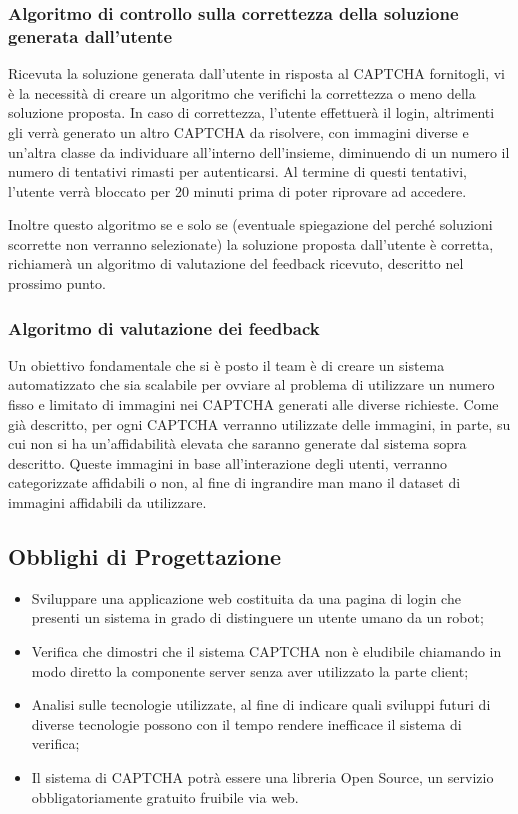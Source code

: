\subsubsection{Algoritmo di controllo sulla correttezza della soluzione generata dall'utente}
Ricevuta la soluzione generata dall'utente in risposta al CAPTCHA fornitogli, vi è la necessità di creare un algoritmo che verifichi la correttezza o meno della soluzione proposta. In caso di correttezza, l'utente effettuerà il login, altrimenti gli verrà generato un altro CAPTCHA da risolvere, con immagini diverse e un'altra classe da individuare all'interno dell'insieme, diminuendo di un numero il numero di tentativi rimasti per autenticarsi. Al termine di questi tentativi, l'utente verrà bloccato per 20 minuti prima di poter riprovare ad accedere. 

Inoltre questo algoritmo se e solo se (eventuale spiegazione del perché soluzioni scorrette non verranno selezionate) la soluzione proposta dall'utente è corretta, richiamerà un algoritmo di valutazione del feedback ricevuto, descritto nel prossimo punto.

\subsubsection{Algoritmo di valutazione dei feedback}
Un obiettivo fondamentale che si è posto il team è di creare un sistema automatizzato che sia scalabile per ovviare al problema di utilizzare un numero fisso e limitato di immagini nei CAPTCHA generati alle diverse richieste. Come già descritto, per ogni CAPTCHA verranno utilizzate delle immagini, in parte, su cui non si ha un'affidabilità elevata che saranno generate dal sistema sopra descritto. Queste immagini in base all'interazione degli utenti, verranno categorizzate affidabili o non, al fine di ingrandire man mano il dataset di immagini affidabili da utilizzare.

\subsection{Obblighi di Progettazione}
\begin{itemize}
    \item Sviluppare una applicazione web costituita da una pagina di login che presenti un sistema in grado di distinguere un utente umano da un robot;
    \item Verifica che dimostri che il sistema CAPTCHA non è eludibile chiamando in modo diretto la componente server senza aver utilizzato la parte client;
    \item Analisi sulle tecnologie utilizzate, al fine di indicare quali sviluppi futuri di diverse tecnologie possono con il tempo rendere inefficace il sistema di verifica;
    \item Il sistema di CAPTCHA potrà essere una libreria Open Source, un servizio obbligatoriamente gratuito fruibile via web.
\end{itemize}

